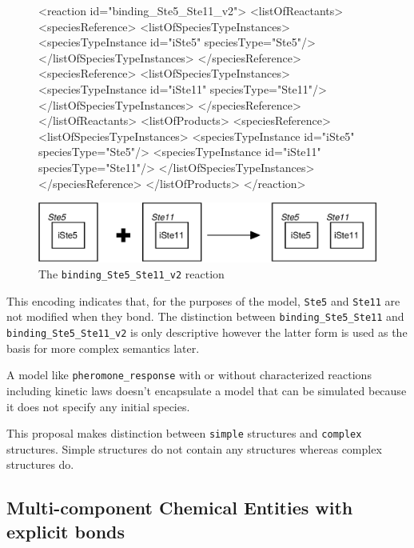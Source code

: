 \documentclass{cekarticle}
\begin{document}
\begin{figure}[h]
\begin{example}
<reaction id="binding_Ste5_Ste11_v2">
    <listOfReactants>
        <speciesReference>
            <listOfSpeciesTypeInstances>
                <speciesTypeInstance id="iSte5" speciesType="Ste5"/>
            </listOfSpeciesTypeInstances>
        </speciesReference>
        <speciesReference>
            <listOfSpeciesTypeInstances>
                <speciesTypeInstance id="iSte11" speciesType="Ste11"/>
            </listOfSpeciesTypeInstances>
        </speciesReference>
    </listOfReactants>
    <listOfProducts>
        <speciesReference>
            <listOfSpeciesTypeInstances>
                <speciesTypeInstance id="iSte5" speciesType="Ste5"/>
                <speciesTypeInstance id="iSte11" speciesType="Ste11"/>
            </listOfSpeciesTypeInstances>
        </speciesReference>
    </listOfProducts>
</reaction>
\end{example}
  \vspace*{8pt}
  \centering
  \includegraphics[scale = 0.7]{binding_Ste5_Ste11_v2.eps}
  \caption{The \texttt{binding\_Ste5\_Ste11\_v2} reaction}
  \label{fig:binding_Ste5_Ste11_v2}
\end{figure}

This encoding indicates that, for the purposes of the model, \texttt{Ste5} and \texttt{Ste11}
are not modified when they bond.  The distinction between \texttt{binding\_Ste5\_Ste11}
and \texttt{binding\_Ste5\_Ste11\_v2} is only descriptive however the latter form
is used as the basis for more complex semantics later. 

A model like \texttt{pheromone\_response} with or without characterized reactions including kinetic laws
doesn't encapsulate a model that can be simulated because it does not specify any initial species.

This proposal makes distinction between \texttt{simple}  structures and 
\texttt{complex}  structures.  Simple  structures
do not contain any  structures whereas complex  structures
do.

\subsection{Multi-component Chemical Entities with explicit bonds}
\label{sec:explicitbonds}
\end{document}
